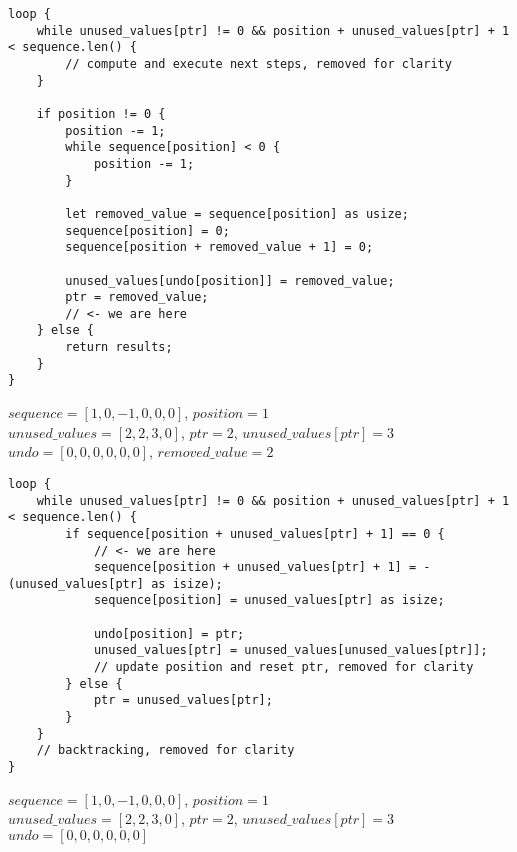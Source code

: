 \begin{frame}[fragile]
    \begin{verbatim}
loop {
    while unused_values[ptr] != 0 && position + unused_values[ptr] + 1 < sequence.len() {
        // compute and execute next steps, removed for clarity
    }
    
    if position != 0 {
        position -= 1;
        while sequence[position] < 0 {
            position -= 1;
        }
        
        let removed_value = sequence[position] as usize;
        sequence[position] = 0;
        sequence[position + removed_value + 1] = 0;

        unused_values[undo[position]] = removed_value;
        ptr = removed_value;
        // <- we are here
    } else {
        return results;
    }
}
    \end{verbatim}
    $sequence = [1, 0, -1, 0, 0, 0]$, $position = 1$\\
    $unused\_values = [2, 2, 3, 0]$, $ptr = 2$, $unused\_values[ptr] = 3$\\
    $undo = [0, 0, 0, 0, 0, 0]$, $removed\_value = 2$
\end{frame}
\begin{frame}[fragile]
    \begin{verbatim}
loop {
    while unused_values[ptr] != 0 && position + unused_values[ptr] + 1 < sequence.len() {
        if sequence[position + unused_values[ptr] + 1] == 0 {
            // <- we are here
            sequence[position + unused_values[ptr] + 1] = -(unused_values[ptr] as isize);
            sequence[position] = unused_values[ptr] as isize;

            undo[position] = ptr;
            unused_values[ptr] = unused_values[unused_values[ptr]];
            // update position and reset ptr, removed for clarity
        } else {
            ptr = unused_values[ptr];
        }
    }
    // backtracking, removed for clarity
}
    \end{verbatim}
    $sequence = [1, 0, -1, 0, 0, 0]$, $position = 1$\\
    $unused\_values = [2, 2, 3, 0]$, $ptr = 2$, $unused\_values[ptr] = 3$\\
    $undo = [0, 0, 0, 0, 0, 0]$
\end{frame}
